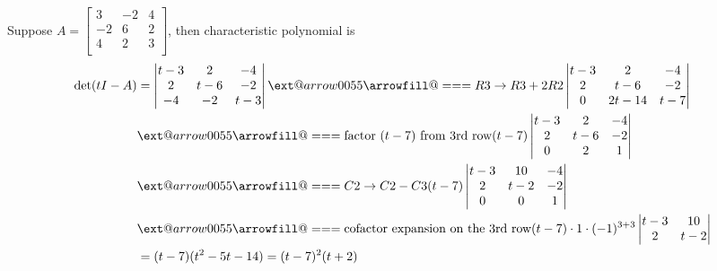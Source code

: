 \documentclass{beamer}
\makeatletter
\newcommand*{\Relbarfill@}{\arrowfill@\Relbar\Relbar\Relbar}
\newcommand*{\xequal}[2][]{\ext@arrow 0055\Relbarfill@{#1}{#2}}
\theoremstyle{definition}
\theoremstyle{remark}
\makeatother
\begin{document}
\begin{frame}[t]
\begin{example}
Suppose $A=\begin{bmatrix}
3&-2&4\\
-2&6&2\\
4&2&3\\
\end{bmatrix}$\pause, then characteristic polynomial is
\begin{align*}
\det(tI-A)&=\left|\begin{matrix}
t-3&2&-4\\
2&t-6&-2\\
-4&-2&t-3
\end{matrix}\right|\xequal{R3\rightarrow R3+2R2}\left|\begin{matrix}
t-3&2&-4\\
2&t-6&-2\\
0&2t-14&t-7
\end{matrix}\right|\\
&\xequal{\text{factor $(t-7)$ from 3rd row}}(t-7)\left|\begin{matrix}
t-3&2&-4\\
2&t-6&-2\\
0&2&1
\end{matrix}\right|\\
&\xequal{C2\rightarrow C2-C3}(t-7)\left|\begin{matrix}
t-3&10&-4\\
2&t-2&-2\\
0&0&1
\end{matrix}\right|\\
&\xequal{\text{cofactor expansion on the 3rd row}}(t-7)\cdot1\cdot(-1)^{3+3}\left|\begin{matrix}
t-3&10\\
2&t-2
\end{matrix}\right|\\
&=(t-7)(t^2-5t-14)=(t-7)^2(t+2)
\end{align*}
\end{example}
\end{frame}
\end{document}
